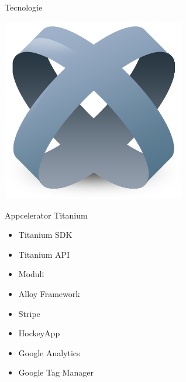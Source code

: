		\begin{frame}{Tecnologie}
			\begin{minipage}{\textwidth}
				\begin{minipage}{0.49\textwidth}
					\includegraphics[width=0.6\textwidth]{capitolo_2/immagini/titanium.png}
				\end{minipage}
				\begin{minipage}{0.49\textwidth}
					\begin{block}{Appcelerator Titanium}
						\begin{itemize}
							\item Titanium SDK
							\item Titanium API
							\item Moduli
							\item Alloy Framework
						\end{itemize}
					\end{block}
				\end{minipage}\par
			\end{minipage}\par
			\vspace{3mm}
			\begin{minipage}{\textwidth}
				\begin{minipage}{0.49\textwidth}
					\begin{itemize}
						\item Stripe
						\item HockeyApp
						\item Google Analytics
						\item Google Tag Manager
					\end{itemize}
				\end{minipage}
				\begin{minipage}{0.49\textwidth}

\end{minipage}
\end{minipage}
\end{frame}

